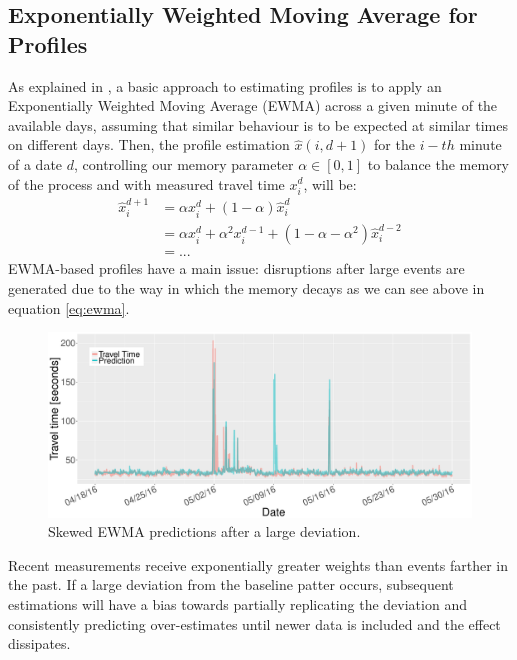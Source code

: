 \documentclass[a4paper, 10pt, conference]{ieeeconf}      %
\begin{document}
\subsection{Exponentially Weighted Moving Average for Profiles} \label{ewma}
As explained in \cite{ttprofiles}, a basic approach to estimating profiles is to apply an Exponentially Weighted Moving Average (EWMA) across a given minute of the available days, assuming that similar behaviour is to be expected at similar times on different days. 
Then, the profile estimation $\hat{x}(i,d+1)$ for the $i-th$ minute of a date $d$, controlling our memory parameter $\alpha \in [0,1]$ to balance the memory of the process and with measured travel time $x_i^d$, will be:
\begin{equation}
\begin{aligned}
\hat{x}^{d+1}_i \!&= \alpha  x^{d}_{i} + (1-\alpha)\hat{x}^{d}_{i} \\ 
&= \alpha  x^{d}_{i} + \alpha^2  x^{d-1}_{i} + (1-\alpha - \alpha^2) \hat{x}^{d-2}_{i}\\ 
&= ...
\end{aligned}
\label{eq:ewma}
\end{equation}
EWMA-based profiles have a main issue: disruptions after large events are generated due to the way in which the memory decays as we can see above in equation \ref{eq:ewma}.
\begin{figure}[htbp]
	\centerline{\includegraphics[width=\linewidth]{./images/EWMA.pdf}}
	\caption{Skewed EWMA predictions after a large deviation.}
	\label{fig:EWMA}
\end{figure}
Recent measurements receive exponentially greater weights than events farther in the past. 
If a large deviation from the baseline patter occurs, subsequent estimations will have a bias towards partially replicating the deviation and consistently predicting over-estimates until newer data is included and the effect dissipates.
\end{document}
